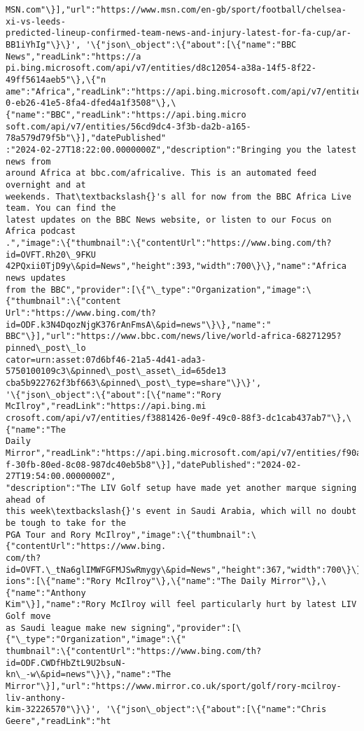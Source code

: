 \documentclass[11pt]{article}
\begin{document}
\begin{Verbatim}[commandchars=\\\{\}]
MSN.com"\}],"url":"https://www.msn.com/en-gb/sport/football/chelsea-xi-vs-leeds-
predicted-lineup-confirmed-team-news-and-injury-latest-for-fa-cup/ar-
BB1iYhIg"\}\}', '\{"json\_object":\{"about":[\{"name":"BBC News","readLink":"https://a
pi.bing.microsoft.com/api/v7/entities/d8c12054-a38a-14f5-8f22-49ff5614aeb5"\},\{"n
ame":"Africa","readLink":"https://api.bing.microsoft.com/api/v7/entities/5e22fc1
0-eb26-41e5-8fa4-dfed4a1f3508"\},\{"name":"BBC","readLink":"https://api.bing.micro
soft.com/api/v7/entities/56cd9dc4-3f3b-da2b-a165-78a579d79f5b"\}],"datePublished"
:"2024-02-27T18:22:00.0000000Z","description":"Bringing you the latest news from
around Africa at bbc.com/africalive. This is an automated feed overnight and at
weekends. That\textbackslash{}'s all for now from the BBC Africa Live team. You can find the
latest updates on the BBC News website, or listen to our Focus on Africa podcast
.","image":\{"thumbnail":\{"contentUrl":"https://www.bing.com/th?id=OVFT.Rh20\_9FKU
42PQxii0TjD9y\&pid=News","height":393,"width":700\}\},"name":"Africa news updates
from the BBC","provider":[\{"\_type":"Organization","image":\{"thumbnail":\{"content
Url":"https://www.bing.com/th?id=ODF.k3N4DqozNjgK376rAnFmsA\&pid=news"\}\},"name":"
BBC"\}],"url":"https://www.bbc.com/news/live/world-africa-68271295?pinned\_post\_lo
cator=urn:asset:07d6bf46-21a5-4d41-ada3-5750100109c3\&pinned\_post\_asset\_id=65de13
cba5b922762f3bf663\&pinned\_post\_type=share"\}\}',
'\{"json\_object":\{"about":[\{"name":"Rory McIlroy","readLink":"https://api.bing.mi
crosoft.com/api/v7/entities/f3881426-0e9f-49c0-88f3-dc1cab437ab7"\},\{"name":"The
Daily Mirror","readLink":"https://api.bing.microsoft.com/api/v7/entities/f90a0cc
f-30fb-80ed-8c08-987dc40eb5b8"\}],"datePublished":"2024-02-27T19:54:00.0000000Z",
"description":"The LIV Golf setup have made yet another marque signing ahead of
this week\textbackslash{}'s event in Saudi Arabia, which will no doubt be tough to take for the
PGA Tour and Rory McIlroy","image":\{"thumbnail":\{"contentUrl":"https://www.bing.
com/th?id=OVFT.\_tNa6glIMWFGFMJSwRmygy\&pid=News","height":367,"width":700\}\},"ment
ions":[\{"name":"Rory McIlroy"\},\{"name":"The Daily Mirror"\},\{"name":"Anthony
Kim"\}],"name":"Rory McIlroy will feel particularly hurt by latest LIV Golf move
as Saudi league make new signing","provider":[\{"\_type":"Organization","image":\{"
thumbnail":\{"contentUrl":"https://www.bing.com/th?id=ODF.CWDfHbZtL9U2bsuN-
kn\_-w\&pid=news"\}\},"name":"The
Mirror"\}],"url":"https://www.mirror.co.uk/sport/golf/rory-mcilroy-liv-anthony-
kim-32226570"\}\}', '\{"json\_object":\{"about":[\{"name":"Chris Geere","readLink":"ht

\end{Verbatim}
\end{document}
